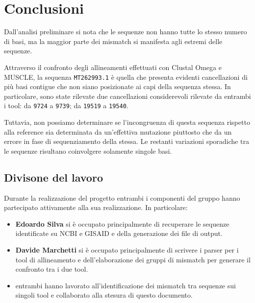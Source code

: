 \documentclass[11pt,italian]{article}
\begin{document}
\section{Conclusioni}
Dall'analisi preliminare si nota che le sequenze non hanno tutte lo stesso numero di basi, ma la maggior parte dei mismatch si manifesta agli estremi delle sequenze.

Attraverso il confronto degli allineamenti effettuati con Clustal Omega e MUSCLE, la sequenza \lstinline{MT262993.1} è quella che presenta evidenti cancellazioni di più basi contigue che non siano posizionate ai capi della sequenza stessa.
In particolare, sono state rilevate due cancellazioni considerevoli rilevate da entrambi i tool: da \lstinline{9724} a \lstinline{9739}; da \lstinline{19519} a \lstinline{19540}.

Tuttavia, non possiamo determinare se l'incongruenza di questa sequenza rispetto alla reference sia determinata da un'effettiva mutazione piuttosto che da un errore in fase di sequenziamento della stessa.
Le restanti variazioni sporadiche tra le sequenze risultano coinvolgere solamente singole basi.

\subsection{Divisone del lavoro}
Durante la realizzazione del progetto entrambi i componenti del gruppo hanno partecipato attivamente alla sua realizzazione. In particolare:
\begin{itemize}
  \item \textbf{Edoardo Silva} si è occupato principalmente di recuperare le sequenze identificate su NCBI e GISAID e della generazione dei file di output.
  \item \textbf{Davide Marchetti} si è occupato principalmente di scrivere i parser per i tool di allineamento e dell'elaborazione dei gruppi di mismatch per generare il confronto tra i due tool.
  \item entrambi hanno lavorato all'identificazione dei mismatch tra sequenze sui singoli tool e collaborato alla stesura di questo documento.
\end{itemize}
\end{document}
